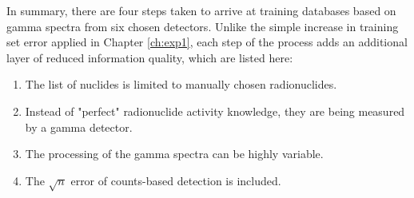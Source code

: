 In summary, there are four steps taken to arrive at training databases based on
gamma spectra from six chosen detectors. Unlike the simple increase in training
set error applied in Chapter \ref{ch:exp1}, each step of the process adds an
additional layer of reduced information quality, which are listed here:
\begin{enumerate}
  \item The list of nuclides is limited to manually chosen radionuclides.
  \item Instead of "perfect" radionuclide activity knowledge, they are being 
        measured by a gamma detector.
  \item The processing of the gamma spectra can be highly variable.
  \item The $\sqrt{n}$ error of counts-based detection is included. 
\end{enumerate}

